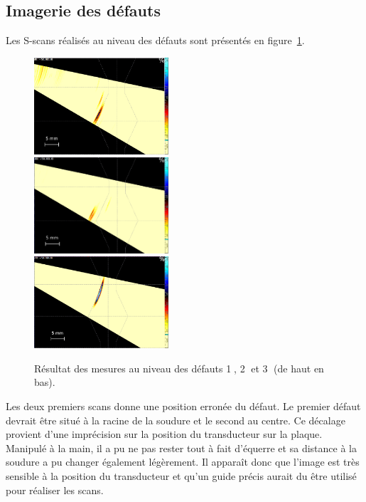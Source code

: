 \documentclass[twoside]{article}
\begin{document}
\begin{multicols}{2}
\subsection{Imagerie des défauts}

Les S-scans réalisés au niveau des défauts sont présentés en figure~\ref{resultat}. 


\begin{figure}[H]
	\centering
	\includegraphics[width=5cm]{images/def1.png}\\
	\includegraphics[width=5cm]{images/def2.png}\\
	\includegraphics[width=5cm]{images/def3.png}\\
	\caption{\label{resultat} Résultat des mesures au niveau des défauts \textcircled{\footnotesize 1}, \textcircled{\footnotesize 2} et \textcircled{\footnotesize 3} (de haut en bas).}
\end{figure}

Les deux premiers scans donne une position erronée du défaut. Le premier défaut devrait être situé à la racine de la soudure et le second au centre. Ce décalage provient d'une imprécision sur la position du transducteur sur la plaque. Manipulé à la main, il a pu ne pas rester tout à fait d'équerre et sa distance à la soudure a pu changer également légèrement. Il apparaît donc que l'image est très sensible à la position du transducteur et qu'un guide précis aurait du être utilisé pour réaliser les scans.\\


\end{multicols}
\end{document}
